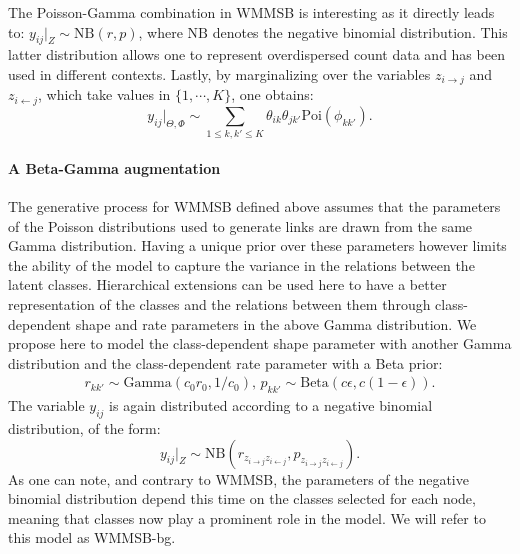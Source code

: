 The Poisson-Gamma combination in WMMSB is interesting as it directly leads to: $y_{ij}|_{Z} \sim \textrm{NB}(r,p)$, where $\textrm{NB}$ denotes the negative binomial distribution. This latter distribution allows one to represent overdispersed count data and has been used in different contexts.
Lastly, by marginalizing over the variables $z_{i \rightarrow j}$ and $z_{i \leftarrow j}$, which take values in $\{1, \cdots, K\}$, one obtains:
 \begin{equation}\label{eq:PoiCombin}
 y_{ij}|_{\Theta,\Phi} \sim \sum_{1 \le k,k' \le K} \theta_{ik} \theta_{jk'} \textrm{Poi}(\phi_{kk'}).
 \end{equation}
%

\paragraph{A Beta-Gamma augmentation} The generative process for WMMSB defined above assumes that the parameters of the Poisson distributions used to generate links are drawn from the same Gamma distribution. Having a unique prior over these parameters however limits the ability of the model to capture the variance in the relations between the latent classes. Hierarchical extensions can be used here to have a better representation of the classes and the relations between them through class-dependent shape and rate parameters in the above Gamma distribution. We propose here to model the class-dependent shape parameter with another Gamma distribution and the class-dependent rate parameter with a Beta prior:
%
\begin{gather*}
r_{kk'} \sim \textrm{Gamma}(c_0r_0, 1/c_0), \, p_{kk'} \sim \textrm{Beta}(c\epsilon, c(1-\epsilon)).
\end{gather*}
%
The variable $y_{ij}$ is again distributed according to a negative binomial distribution, of the form:
%
\begin{equation}\label{eq:yNB}
y_{ij}|_{Z} \sim \textrm{NB}(r_{z_{i \rightarrow j} z_{i \leftarrow j}},p_{z_{i \rightarrow j} z_{i \leftarrow j}}).
\end{equation}
%
As one can note, and contrary to WMMSB, the parameters of the negative binomial distribution depend this time on the classes selected for each node, meaning that classes now play a prominent role in the model. We will refer to this model as WMMSB-bg.

